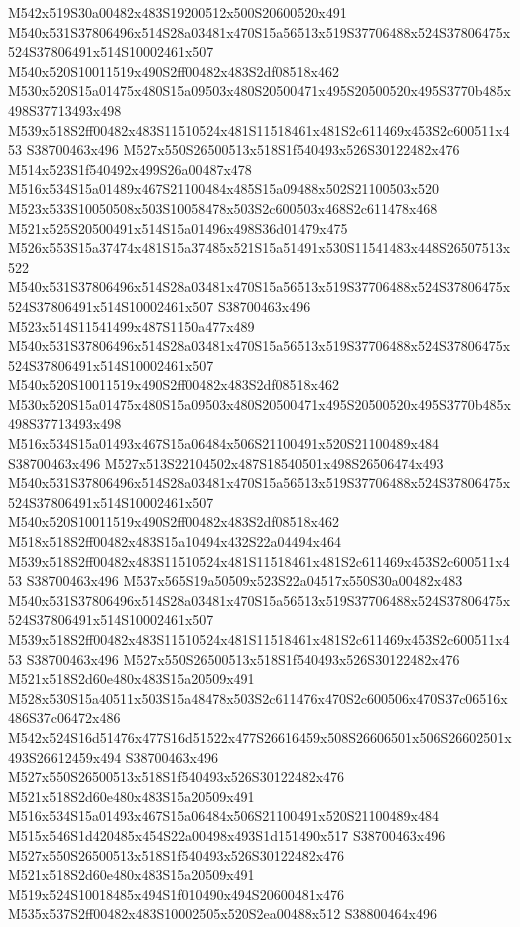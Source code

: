 \documentclass{article}
\begin{document}
\begin{multicols}{2}
M542x519S30a00482x483S19200512x500S20600520x491 M540x531S37806496x514S28a03481x470S15a56513x519S37706488x524S37806475x524S37806491x514S10002461x507 M540x520S10011519x490S2ff00482x483S2df08518x462 M530x520S15a01475x480S15a09503x480S20500471x495S20500520x495S3770b485x498S37713493x498 M539x518S2ff00482x483S11510524x481S11518461x481S2c611469x453S2c600511x453 S38700463x496 M527x550S26500513x518S1f540493x526S30122482x476 M514x523S1f540492x499S26a00487x478 M516x534S15a01489x467S21100484x485S15a09488x502S21100503x520 M523x533S10050508x503S10058478x503S2c600503x468S2c611478x468 M521x525S20500491x514S15a01496x498S36d01479x475 M526x553S15a37474x481S15a37485x521S15a51491x530S11541483x448S26507513x522 M540x531S37806496x514S28a03481x470S15a56513x519S37706488x524S37806475x524S37806491x514S10002461x507 S38700463x496 M523x514S11541499x487S1150a477x489 M540x531S37806496x514S28a03481x470S15a56513x519S37706488x524S37806475x524S37806491x514S10002461x507 M540x520S10011519x490S2ff00482x483S2df08518x462 M530x520S15a01475x480S15a09503x480S20500471x495S20500520x495S3770b485x498S37713493x498 M516x534S15a01493x467S15a06484x506S21100491x520S21100489x484 S38700463x496 M527x513S22104502x487S18540501x498S26506474x493 M540x531S37806496x514S28a03481x470S15a56513x519S37706488x524S37806475x524S37806491x514S10002461x507 M540x520S10011519x490S2ff00482x483S2df08518x462 M518x518S2ff00482x483S15a10494x432S22a04494x464 M539x518S2ff00482x483S11510524x481S11518461x481S2c611469x453S2c600511x453 S38700463x496 M537x565S19a50509x523S22a04517x550S30a00482x483 M540x531S37806496x514S28a03481x470S15a56513x519S37706488x524S37806475x524S37806491x514S10002461x507 M539x518S2ff00482x483S11510524x481S11518461x481S2c611469x453S2c600511x453 S38700463x496 M527x550S26500513x518S1f540493x526S30122482x476 M521x518S2d60e480x483S15a20509x491 M528x530S15a40511x503S15a48478x503S2c611476x470S2c600506x470S37c06516x486S37c06472x486 M542x524S16d51476x477S16d51522x477S26616459x508S26606501x506S26602501x493S26612459x494 S38700463x496 M527x550S26500513x518S1f540493x526S30122482x476 M521x518S2d60e480x483S15a20509x491 M516x534S15a01493x467S15a06484x506S21100491x520S21100489x484 M515x546S1d420485x454S22a00498x493S1d151490x517 S38700463x496 M527x550S26500513x518S1f540493x526S30122482x476 M521x518S2d60e480x483S15a20509x491 M519x524S10018485x494S1f010490x494S20600481x476 M535x537S2ff00482x483S10002505x520S2ea00488x512 S38800464x496


\end{multicols}
\end{document}
